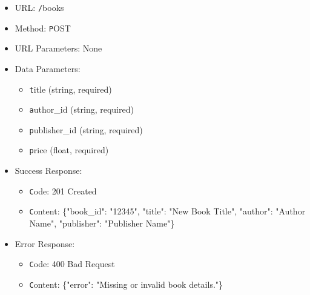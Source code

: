 \begin{itemize}
\item URL: \texttt /books  
\item Method: \texttt POST  
\item URL Parameters: None
\item Data Parameters:
\begin{itemize}
\item \texttt title   (string, required)
\item \texttt author\_id   (string, required)
\item \texttt publisher\_id   (string, required)
\item \texttt price   (float, required)
\end{itemize}
\item Success Response:
\begin{itemize}
\item \texttt Code: 201 Created  
  \item \texttt Content:  \{"book\_id": "12345",
    "title": "New Book Title",
    "author": "Author Name",
    "publisher": "Publisher Name"\}
\end{itemize}
\item Error Response:
\begin{itemize}
  \item \texttt Code: 400 Bad Request  
  \item \texttt Content: \{"error": "Missing or invalid book details."\}
\end{itemize}

\end{itemize}

